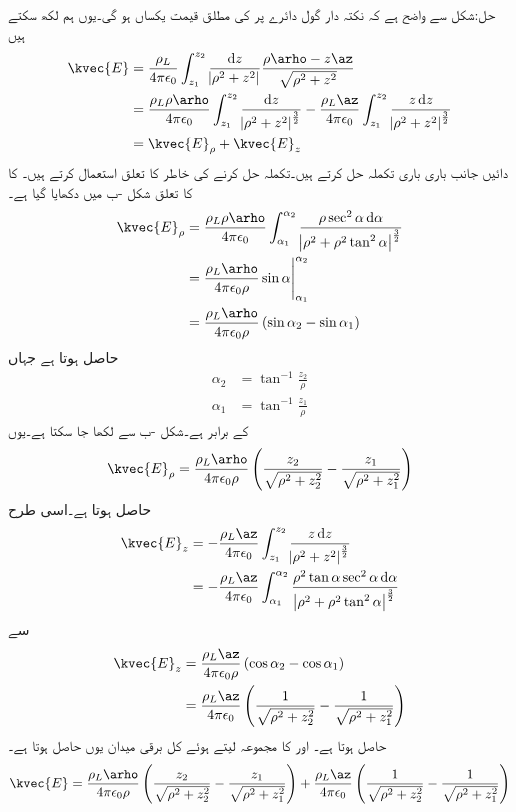 حل:شکل  سے واضح ہے کہ نکتہ دار گول دائرے پر  کی مطلق قیمت  یکساں ہو گی۔یوں ہم لکھ سکتے ہیں
\begin{align*}
\kvec{E}&=\frac{\rho_L}{4\pi\epsilon_0} \int_{z_1}^{z_2} \frac{\dif z}{\abs{\rho^2+z^2}} \frac{\rho\arho-z\az}{\sqrt{\rho^2+z^2}}\\
&=\frac{\rho_L \rho\arho}{4\pi\epsilon_0} \int_{z_1}^{z_2} \frac{\dif z}{\abs{\rho^2+z^2}^{\frac{3}{2}}}-\frac{\rho_L \az}{4\pi\epsilon_0} \int_{z_1}^{z_2} \frac{z\dif z}{\abs{\rho^2+z^2}^{\frac{3}{2}}}\\
&=\kvec{E}_\rho +\kvec{E}_z
\end{align*}
دائیں جانب باری باری تکملہ حل کرتے ہیں۔تکملہ حل کرنے کی خاطر  کا تعلق استعمال کرتے ہیں۔ کا  کا تعلق شکل -ب میں دکھایا گیا ہے۔
\begin{align*}
\kvec{E}_\rho&=\frac{\rho_L \rho\arho}{4\pi\epsilon_0} \int_{\alpha_1}^{\alpha_2} \frac{\rho \sec^2 \alpha\dif \alpha}{\abs{\rho^2+\rho^2 \tan^2 \alpha}^{\frac{3}{2}}}\\
&=\frac{\rho_L \arho}{4\pi\epsilon_0 \rho} \eval{\sin \alpha}_{\alpha_1}^{\alpha_2}\\
&=\frac{\rho_L \arho}{4\pi\epsilon_0 \rho} \left(\sin \alpha_2-\sin \alpha_1 \right)
\end{align*}
حاصل ہوتا ہے جہاں
\begin{align*}
\alpha_2&=\tan^{-1} \frac{z_2}{\rho}\\
\alpha_1&=\tan^{-1} \frac{z_1}{\rho}
\end{align*}
کے برابر ہے۔شکل  -ب سے  لکھا جا سکتا ہے۔یوں
\begin{align*}
\kvec{E}_{\rho}=\frac{\rho_L \arho}{4\pi\epsilon_0 \rho} \left(\frac{z_2}{\sqrt{\rho^2+z_2^2}}-\frac{z_1}{\sqrt{\rho^2+z_1^2}}\right)
\end{align*}
حاصل ہوتا ہے۔اسی طرح
\begin{align*}
\kvec{E}_z&=-\frac{\rho_L \az}{4\pi\epsilon_0} \int_{z_1}^{z_2} \frac{z\dif z}{\abs{\rho^2+z^2}^{\frac{3}{2}}}\\
&=-\frac{\rho_L \az}{4\pi\epsilon_0} \int_{\alpha_1}^{\alpha_2} \frac{\rho^2 \tan \alpha \sec^2 \alpha \dif \alpha}{\abs{\rho^2+\rho^2 \tan^2 \alpha}^{\frac{3}{2}}}
\end{align*}
سے
\begin{align*}
\kvec{E}_z&=\frac{\rho_L \az}{4\pi\epsilon_0 \rho} \left(\cos \alpha_2 -\cos \alpha_1 \right)\\
&=\frac{\rho_L \az}{4\pi\epsilon_0 } \left(\frac{1}{\sqrt{\rho^2+z_2^2}}-\frac{1}{\sqrt{\rho^2+z_1^2}} \right)
\end{align*}
حاصل ہوتا ہے۔ اور  کا مجموعہ لیتے ہوئے کل برقی میدان یوں حاصل ہوتا ہے۔
\begin{align}
\kvec{E}=\frac{\rho_L \arho}{4\pi\epsilon_0 \rho} \left(\frac{z_2}{\sqrt{\rho^2+z_2^2}}-\frac{z_1}{\sqrt{\rho^2+z_1^2}}\right)+\frac{\rho_L \az}{4\pi\epsilon_0 } \left(\frac{1}{\sqrt{\rho^2+z_2^2}}-\frac{1}{\sqrt{\rho^2+z_1^2}} \right)
\end{align}

